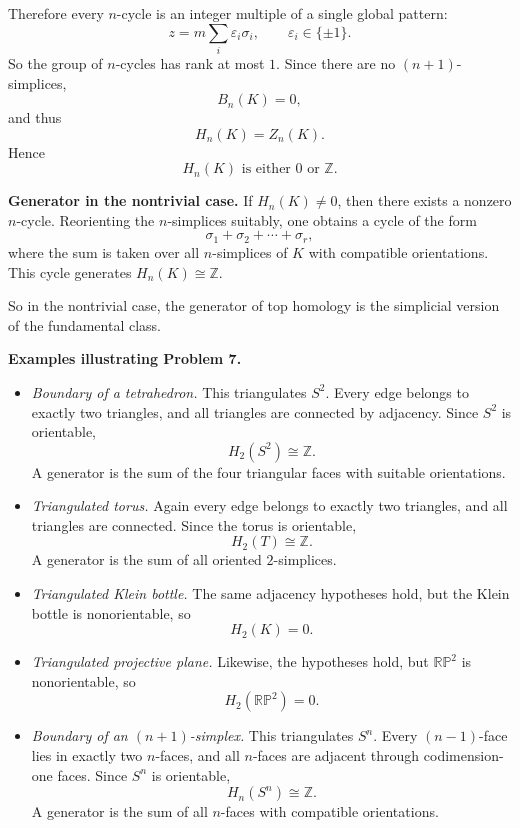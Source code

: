 \documentclass[12pt,a4paper]{article}
\theoremstyle{notespace}
\begin{document}
Therefore every \(n\)-cycle is an integer multiple of a single global pattern:
\[
z=m\sum_i \varepsilon_i \sigma_i,
\qquad \varepsilon_i\in \{\pm1\}.
\]
So the group of \(n\)-cycles has rank at most \(1\). Since there are no \((n+1)\)-simplices,
\[
B_n(K)=0,
\]
and thus
\[
H_n(K)=Z_n(K).
\]
Hence
\[
H_n(K)\text{ is either }0\text{ or }\mathbb Z.
\]

\medskip

\textbf{Generator in the nontrivial case.}
If \(H_n(K)\neq 0\), then there exists a nonzero \(n\)-cycle. Reorienting the \(n\)-simplices suitably, one obtains a cycle of the form
\[
\sigma_1+\sigma_2+\cdots+\sigma_r,
\]
where the sum is taken over all \(n\)-simplices of \(K\) with compatible orientations. This cycle generates \(H_n(K)\cong \mathbb Z\).

So in the nontrivial case, the generator of top homology is the simplicial version of the fundamental class.

\bigskip

\textbf{Examples illustrating Problem 7.}

\begin{itemize}
	\item \emph{Boundary of a tetrahedron.}  
	This triangulates \(S^2\). Every edge belongs to exactly two triangles, and all triangles are connected by adjacency. Since \(S^2\) is orientable,
	\[
	H_2(S^2)\cong \mathbb Z.
	\]
	A generator is the sum of the four triangular faces with suitable orientations.
	
	\item \emph{Triangulated torus.}  
	Again every edge belongs to exactly two triangles, and all triangles are connected. Since the torus is orientable,
	\[
	H_2(T)\cong \mathbb Z.
	\]
	A generator is the sum of all oriented \(2\)-simplices.
	
	\item \emph{Triangulated Klein bottle.}  
	The same adjacency hypotheses hold, but the Klein bottle is nonorientable, so
	\[
	H_2(K)=0.
	\]
	
	\item \emph{Triangulated projective plane.}  
	Likewise, the hypotheses hold, but \(\mathbb{RP}^2\) is nonorientable, so
	\[
	H_2(\mathbb{RP}^2)=0.
	\]
	
	\item \emph{Boundary of an \((n+1)\)-simplex.}  
	This triangulates \(S^n\). Every \((n-1)\)-face lies in exactly two \(n\)-faces, and all \(n\)-faces are adjacent through codimension-one faces. Since \(S^n\) is orientable,
	\[
	H_n(S^n)\cong \mathbb Z.
	\]
	A generator is the sum of all \(n\)-faces with compatible orientations.
\end{itemize}
\end{document}
